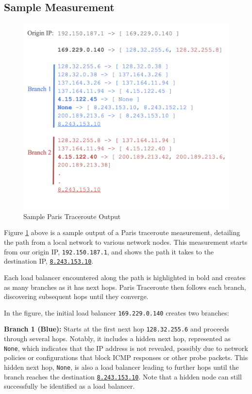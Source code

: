 \documentclass[12pt]{cwru_thesis}
\begin{document}
\subsection{Sample Measurement}
\begin{figure}[H]
    \centering
    \includegraphics[width=\linewidth]{figures/sample.png}
    \caption{Sample Paris Traceroute Output}
    \label{fig:sample}
\end{figure}


Figure \ref{fig:sample} above is a sample output of a Paris traceroute measurement, detailing the path from a local network to various network nodes. This measurement starts from our origin IP, \texttt{192.150.187.1}, and shows the path it takes to the destination IP, \underline{\texttt{8.243.153.10}}.

Each load balancer encountered along the path is highlighted in bold and creates as many branches as it has next hops. Paris Traceroute then follows each branch, discovering subsequent hops until they converge.

In the figure, the initial load balancer \texttt{169.229.0.140} creates two branches:

\textbf{Branch 1 (Blue):} Starts at the first next hop \texttt{128.32.255.6} and proceeds through several hops. Notably, it includes a hidden next hop, represented as \texttt{None}, which indicates that the IP address is not revealed, possibly due to network policies or configurations that block ICMP responses or other probe packets. This hidden next hop, \texttt{None}, is also a load balancer leading to further hops until the branch reaches the destination \underline{\texttt{8.243.153.10}}. Note that a hidden node can still successfully be identified as a load balancer.
\end{document}
